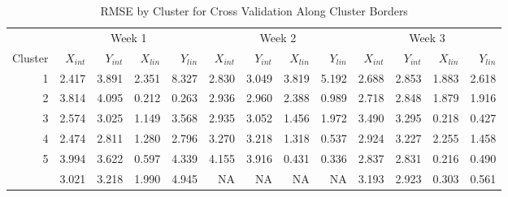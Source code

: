 \documentclass[12pt]{article}
\begin{document}
\begin{table}

\caption{\label{tab:border-clust-tab}RMSE by Cluster for Cross Validation Along Cluster Borders}
\centering
\begin{tabular}[t]{rrrrrrrrrrrrr}
\toprule
\multicolumn{1}{c}{ } & \multicolumn{4}{c}{Week 1} & \multicolumn{4}{c}{Week 2} & \multicolumn{4}{c}{Week 3} \\
\cmidrule(l{3pt}r{3pt}){2-5} \cmidrule(l{3pt}r{3pt}){6-9} \cmidrule(l{3pt}r{3pt}){10-13}
Cluster & $X_{int}$ & $Y_{int}$ & $X_{lin}$ & $Y_{lin}$ & $X_{int}$ & $Y_{int}$ & $X_{lin}$ & $Y_{lin}$ & $X_{int}$ & $Y_{int}$ & $X_{lin}$ & $Y_{lin}$\\
\midrule
1 & 2.417 & 3.891 & 2.351 & 8.327 & 2.830 & 3.049 & 3.819 & 5.192 & 2.688 & 2.853 & 1.883 & 2.618\\
2 & 3.814 & 4.095 & 0.212 & 0.263 & 2.936 & 2.960 & 2.388 & 0.989 & 2.718 & 2.848 & 1.879 & 1.916\\
3 & 2.574 & 3.025 & 1.149 & 3.568 & 2.935 & 3.052 & 1.456 & 1.972 & 3.490 & 3.295 & 0.218 & 0.427\\
4 & 2.474 & 2.811 & 1.280 & 2.796 & 3.270 & 3.218 & 1.318 & 0.537 & 2.924 & 3.227 & 2.255 & 1.458\\
5 & 3.994 & 3.622 & 0.597 & 4.339 & 4.155 & 3.916 & 0.431 & 0.336 & 2.837 & 2.831 & 0.216 & 0.490\\
\addlinespace
6 & 3.021 & 3.218 & 1.990 & 4.945 & NA & NA & NA & NA & 3.193 & 2.923 & 0.303 & 0.561\\
\bottomrule
\end{tabular}
\end{table}
\end{document}

